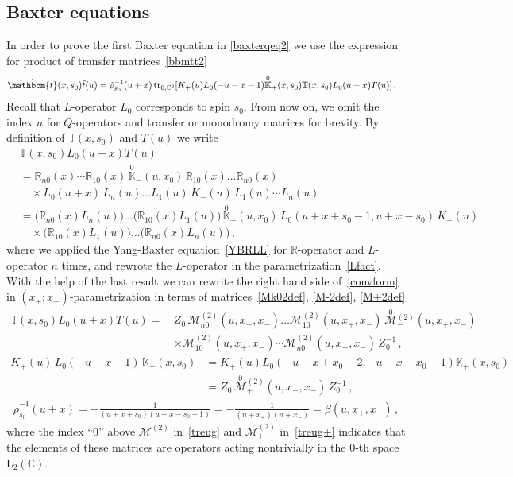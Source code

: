 \documentclass[a4paper,11pt]{article}
\newcommand{\tr}{\mathop{\rm tr}\nolimits}
\numberwithin{equation}{section}
\begin{document}
\subsection{Baxter equations}

In order to prove the first Baxter equation in \eqref{baxterqeq2} we use the expression for product of transfer matrices~\eqref{bbmtt2}
\begin {align}\label{convform}
	&\hat{\mathbbm{t}}(x,s_0)\hat{t}(u)  = \tilde{\rho}_{s_0}^{-1}(u+x)\tr_{0,\mathbb{C}^2}[K_+(u) L_0(-u-x-1) \overset{0}{\mathbb{K}}_+(x,s_0) \mathbb{T}(x,s_0) L_0(u+x) T(u)] \,.
\end{align}
Recall that $L$-operator $L_0$ corresponds to spin $s_0$.
From now on, we omit the index $n$ for $Q$-operators and transfer or monodromy matrices for brevity.
By definition of $\mathbb{T}(x,s_0)$ and $T(u)$ we write 
\begin{align*}
	&
    \mathbb{T}(x,s_0) L_0(u+x) T(u) \\
    &
    = \mathbb{R}_{n0}(x) \cdots \mathbb{R}_{10}(x) \, \overset{0}{\mathbb{K}}_-(u,x_0) \, \mathbb{R}_{10}(x) \dots \mathbb{R}_{n0}(x) \\
    &
    \quad\times
    L_0(u+x) \, L_n(u) \dots L_1(u) \, K_-(u) \, L_1(u) \cdots L_n(u) \\
    &
    = \Big( \mathbb{R}_{n0}(x) L_n(u) \Big) \dots \Big( \mathbb{R}_{10}(x) L_1(u) \Big) \, \overset{0}{\mathbb{K}}_-(u,x_0) \, L_0(u+x+s_0-1,u+x-s_0) \, K_-(u) \\
    &
    \quad\times
    \Big( \mathbb{R}_{10}(x) L_1(u) \Big) \dots \Big( \mathbb{R}_{n0}(x) L_n(u) \Big) \,,
\end{align*}
where we applied the Yang-Baxter equation~\eqref{YBRLL} for $\mathbb{R}$-operator and $L$-operator $n$ times, and rewrote the $L$-operator in the parametrization~\eqref{Lfact}.
With the help of the last result we can rewrite the right hand side of~\eqref{convform} in $(x_+;x_-)$-parametrization in terms of matrices~\eqref{Mk02def}, \eqref{M-2def}, \eqref{M+2def}
\begin{align}
\nonumber
\mathbb{T}(x,s_0) L_0(u+x) T(u) = \, &
Z_0\,\mathcal{M}^{(2)}_{n0}(u,x_+,x_-) \dots \mathcal{M}^{(2)}_{10}(u,x_+,x_-) \, \overset{0}{\mathcal{M}}{}^{(2)}_-(u,x_+,x_-) \\
\label{treug}
&\times \mathcal{M}^{(2)}_{10}(u,x_+,x_-) \cdots \mathcal{M}^{(2)}_{n0}(u,x_+,x_-) \, Z_0^{-1} \,,
\end{align}
\begin{align}
	\nonumber
	K_+(u)\,L_0(-u-x-1)\,\mathbb{K}_+(x,s_0) & =
	K_+(u)L_0(-u-x+x_0-2,-u-x-x_0-1)\mathbb{K}_+(x,s_0) \\
	\label{treug+}
	& = Z_0\,\overset{0}{\mathcal{M}}{}^{(2)}_+(u,x_+,x_-)\,Z_0^{-1} \,,
\end{align}
\begin{align} \nonumber
	\tilde{\rho}_{s_0}^{-1}(u+x) = -\frac{1}{(u+x+s_0)(u+x-s_0+1)} = -\frac{1}{(u+x_+)(u+x_-)} = \beta(u,x_+,x_-) \,,
\end{align}
where the index ``$0$'' above $\mathcal{M}^{(2)}_-$ in~\eqref{treug} and $\mathcal{M}^{(2)}_+$ in~\eqref{treug+} indicates that the elements of these matrices are operators acting nontrivially in the $0$-th space $\mathrm{L}_2(\mathbb{C})$.
\end{document}
